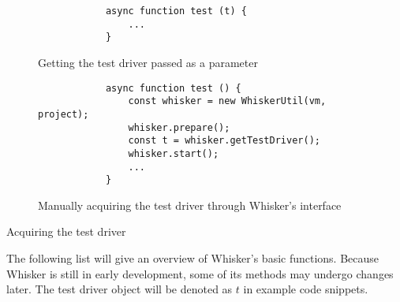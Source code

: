 \begin{listing}[htpb]
    \centering
    \begin{subfigure}[b]{.35\textwidth}
        \begin{verbatim}
            async function test (t) {
                ...
            }
        \end{verbatim}
        \vspace{-\bigskipamount}
        \caption{Getting the test driver passed as a parameter}
    \end{subfigure}
    \hspace{.05\textwidth}
    \begin{subfigure}[b]{.50\textwidth}
        \begin{verbatim}
            async function test () {
                const whisker = new WhiskerUtil(vm, project);
                whisker.prepare();
                const t = whisker.getTestDriver();
                whisker.start();
                ...
            }
        \end{verbatim}
        \vspace{-\bigskipamount}
        \caption{Manually acquiring the test driver through Whisker's interface}
    \end{subfigure}
    \caption{Acquiring the test driver}
    \label{fig:examples_of_how_to_acquire_the_test_driver}
\end{listing}

The following list will give an overview of Whisker's basic functions.
Because Whisker is still in early development, some of its methods may undergo changes later.
The test driver object will be denoted as $t$ in example code snippets.

